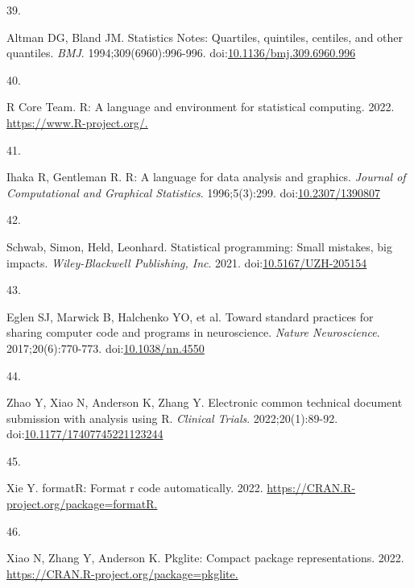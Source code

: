 \documentclass[
]{book}
\newlength{\cslhangindent}
\newlength{\csllabelwidth}
\newlength{\cslentryspacingunit} %
\newenvironment{CSLReferences}[2] %
 {%
  \setlength{\parindent}{0pt}
  \ifodd #1
  \let\oldpar\par
  \def\par{\hangindent=\cslhangindent\oldpar}
  \fi
  \setlength{\parskip}{#2\cslentryspacingunit}
 }%
 {}
\newcommand{\CSLLeftMargin}[1]{\parbox[t]{\csllabelwidth}{#1}}
\newcommand{\CSLRightInline}[1]{\parbox[t]{\linewidth - \csllabelwidth}{#1}\break}
\begin{document}
\begin{CSLReferences}{0}{0}
\leavevmode{}%
\CSLLeftMargin{39. }%
\CSLRightInline{Altman DG, Bland JM. Statistics Notes: Quartiles, quintiles, centiles, and other quantiles. \emph{BMJ}. 1994;309(6960):996-996. doi:\href{https://doi.org/10.1136/bmj.309.6960.996}{10.1136/bmj.309.6960.996}}

\leavevmode{}%
\CSLLeftMargin{40. }%
\CSLRightInline{R Core Team. R: A language and environment for statistical computing. 2022. \href{https://www.R-project.org/}{https://www.R-project.org/.}}

\leavevmode{}%
\CSLLeftMargin{41. }%
\CSLRightInline{Ihaka R, Gentleman R. R: A language for data analysis and graphics. \emph{Journal of Computational and Graphical Statistics}. 1996;5(3):299. doi:\href{https://doi.org/10.2307/1390807}{10.2307/1390807}}

\leavevmode{}%
\CSLLeftMargin{42. }%
\CSLRightInline{Schwab, Simon, Held, Leonhard. Statistical programming: Small mistakes, big impacts. \emph{Wiley-Blackwell Publishing, Inc}. 2021. doi:\href{https://doi.org/10.5167/UZH-205154}{10.5167/UZH-205154}}

\leavevmode{}%
\CSLLeftMargin{43. }%
\CSLRightInline{Eglen SJ, Marwick B, Halchenko YO, et al. Toward standard practices for sharing computer code and programs in neuroscience. \emph{Nature Neuroscience}. 2017;20(6):770-773. doi:\href{https://doi.org/10.1038/nn.4550}{10.1038/nn.4550}}

\leavevmode{}%
\CSLLeftMargin{44. }%
\CSLRightInline{Zhao Y, Xiao N, Anderson K, Zhang Y. Electronic common technical document submission with analysis using R. \emph{Clinical Trials}. 2022;20(1):89-92. doi:\href{https://doi.org/10.1177/17407745221123244}{10.1177/17407745221123244}}

\leavevmode{}%
\CSLLeftMargin{45. }%
\CSLRightInline{Xie Y. formatR: Format r code automatically. 2022. \href{https://CRAN.R-project.org/package=formatR}{https://CRAN.R-project.org/package=formatR.}}

\leavevmode{}%
\CSLLeftMargin{46. }%
\CSLRightInline{Xiao N, Zhang Y, Anderson K. Pkglite: Compact package representations. 2022. \href{https://CRAN.R-project.org/package=pkglite}{https://CRAN.R-project.org/package=pkglite.}}


\end{CSLReferences}
\end{document}

